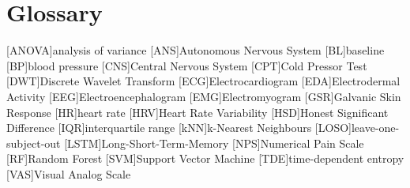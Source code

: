 \chapter{Glossary}

\footnotesize
\SingleSpacing

\begin{acronym}[AAAAAA]

	[ANOVA]{analysis of variance}
	[ANS]{Autonomous Nervous System}
	[BL]{baseline}
	[BP]{blood pressure}
	[CNS]{Central Nervous System}
	[CPT]{Cold Pressor Test}
	[DWT]{Discrete Wavelet Transform}
	[ECG]{Electrocardiogram}
	[EDA]{Electrodermal Activity}
	[EEG]{Electroencephalogram}
	[EMG]{Electromyogram}
	[GSR]{Galvanic Skin Response}
	[HR]{heart rate}
	[HRV]{Heart Rate Variability}
	[HSD]{Honest Significant Difference}
	[IQR]{interquartile range}
	[kNN]{k-Nearest Neighbours}
	[LOSO]{leave-one-subject-out}
	[LSTM]{Long-Short-Term-Memory}
	[NPS]{Numerical Pain Scale}
	[RF]{Random Forest}
	[SVM]{Support Vector Machine}
	[TDE]{time-dependent entropy}
	[VAS]{Visual Analog Scale}


\end{acronym}

